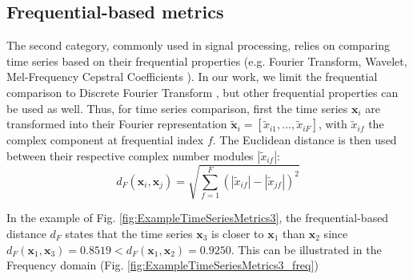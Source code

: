 \subsection{Frequential-based metrics}
The second category, commonly used in signal processing, relies on comparing time series based on their frequential properties (e.g. Fourier Transform, Wavelet, Mel-Frequency Cepstral Coefficients \cite{Sahidullah2012,Torrence1998,Brigham1967}). In our work, we limit the frequential comparison to Discrete Fourier Transform \cite{Lhermitte2011a}, but other frequential properties can be used as well. Thus, for time series comparison, first the time series $\textbf{x}_i$ are transformed into their Fourier representation $\tilde{\textbf{x}}_i=[\tilde{x}_{i1}, ...,  \tilde{x}_{iF}]$, with $\tilde{x}_{if}$ the complex component at frequential index $f$. The Euclidean distance is then used  between their respective complex number modules $|\tilde{x}_{if}|$:
\begin{equation}
d_{F}(\textbf{x}_i,\textbf{x}_j) = \sqrt{\sum_{f=1}^{F} 
	(|\tilde{x}_{if}|-|\tilde{x}_{jf}|)^2}
\label{eq:F}
\end{equation}

In the example of Fig. \ref{fig:ExampleTimeSeriesMetrics3}, the frequential-based distance $d_F$ states that the time series $\textbf{x}_3$ is closer to $\textbf{x}_1$ than $\textbf{x}_2$ since $d_F(\textbf{x}_1,\textbf{x}_3) = 0.8519 < d_F(\textbf{x}_1,\textbf{x}_2) = 0.9250$. This can be illustrated in the Frequency domain (Fig. \ref{fig:ExampleTimeSeriesMetrics3_freq})




